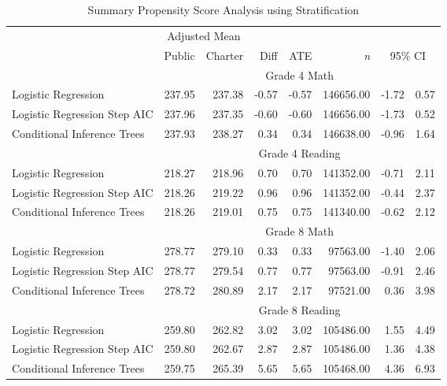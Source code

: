 \begin{table}[ht]
\begin{center}
\caption{Summary Propensity Score Analysis using Stratification}
\label{overallresults}
\begin{tabular}{lrrrrrrr}
  \hline
  & \multicolumn{ 2}{c}{Adjusted Mean} &  & \multicolumn{1x}{c}{} &  &  & \multicolumn{1}{c}{} \\ \cline{2-3} & Public & Charter & Diff & ATE & \textit{n} & \multicolumn{2}{c}{95\% CI} \\ \hline  & \multicolumn{7}{c}{Grade 4 Math} \\ \cline{2-8} \hline
Logistic Regression & 237.95 & 237.38 & -0.57 & -0.57 & 146656.00 & -1.72 & 0.57 \\ 
  Logistic Regression Step AIC & 237.96 & 237.35 & -0.60 & -0.60 & 146656.00 & -1.73 & 0.52 \\ 
  Conditional Inference Trees & 237.93 & 238.27 & 0.34 & 0.34 & 146638.00 & -0.96 & 1.64 \\ 
    & \multicolumn{7}{c}{Grade 4 Reading} \\ \cline{2-8}Logistic Regression & 218.27 & 218.96 & 0.70 & 0.70 & 141352.00 & -0.71 & 2.11 \\ 
  Logistic Regression Step AIC & 218.26 & 219.22 & 0.96 & 0.96 & 141352.00 & -0.44 & 2.37 \\ 
  Conditional Inference Trees & 218.26 & 219.01 & 0.75 & 0.75 & 141340.00 & -0.62 & 2.12 \\ 
    & \multicolumn{7}{c}{Grade 8 Math} \\ \cline{2-8}Logistic Regression & 278.77 & 279.10 & 0.33 & 0.33 & 97563.00 & -1.40 & 2.06 \\ 
  Logistic Regression Step AIC & 278.77 & 279.54 & 0.77 & 0.77 & 97563.00 & -0.91 & 2.46 \\ 
  Conditional Inference Trees & 278.72 & 280.89 & 2.17 & 2.17 & 97521.00 & 0.36 & 3.98 \\ 
    & \multicolumn{7}{c}{Grade 8 Reading} \\ \cline{2-8}Logistic Regression & 259.80 & 262.82 & 3.02 & 3.02 & 105486.00 & 1.55 & 4.49 \\ 
  Logistic Regression Step AIC & 259.80 & 262.67 & 2.87 & 2.87 & 105486.00 & 1.36 & 4.38 \\ 
  Conditional Inference Trees & 259.75 & 265.39 & 5.65 & 5.65 & 105468.00 & 4.36 & 6.93 \\ 
   \hline
\end{tabular}
\end{center}
\end{table}
